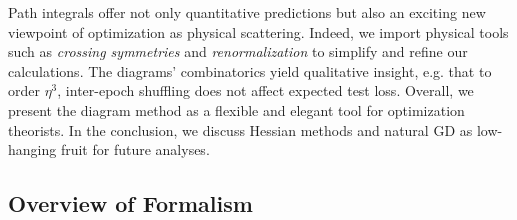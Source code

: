 \documentclass{article}
\theoremstyle{plain}
\theoremstyle{definition}
\begin{document}
        Path integrals offer not only quantitative predictions but also an
        exciting new viewpoint of optimization as physical scattering.  Indeed,
        we import physical tools such as \emph{crossing symmetries}
        \citep{dy49b} and \emph{renormalization} \citep{ge54} to simplify and
        refine our calculations.  The diagrams' combinatorics yield qualitative
        insight, e.g. that to order $\eta^3$, inter-epoch shuffling does not
        affect expected test loss.  Overall, we present the diagram method as a
        flexible and elegant tool for optimization theorists.  In the
        conclusion, we discuss Hessian methods and natural GD as
        low-hanging fruit for future analyses.

    \subsection{Overview of Formalism}

\end{document}
